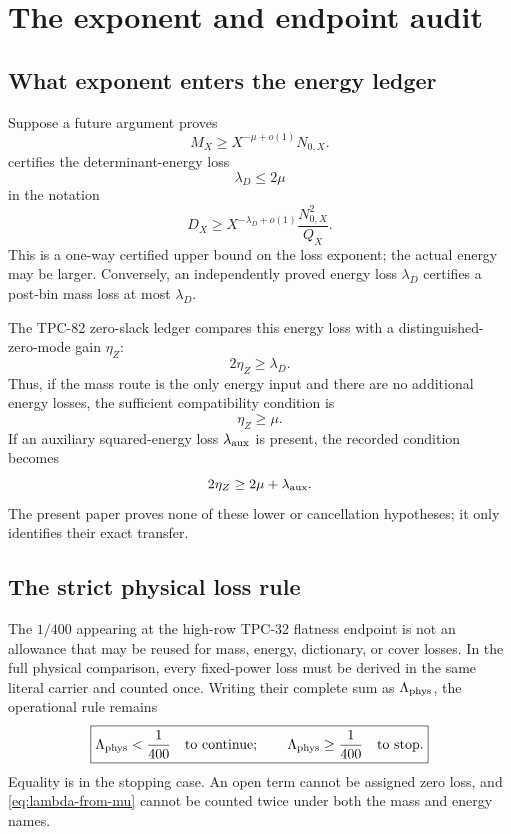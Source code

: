 \section{The exponent and endpoint audit}
\label{sec:endpoint-audit}

\subsection{What exponent enters the energy ledger}

Suppose a future argument proves
\[
 M_X\ge X^{-\mu+o(1)}N_{0,X}.
\]
 certifies the determinant-energy loss
\begin{equation}
 \lambda_D\le2\mu
\label{eq:lambda-from-mu}
\end{equation}
in the notation
\[
 D_X\ge
 X^{-\lambda_D+o(1)}
 \frac{N_{0,X}^2}{Q_X}.
\]
This is a one-way certified upper bound on the loss exponent; the
actual energy may be larger.  Conversely, an independently proved
energy loss \(\lambda_D\) certifies a post-bin mass loss at most
\(\lambda_D\).

The TPC-82 zero-slack ledger compares this energy loss with a
distinguished-zero-mode gain \(\eta_Z\):
\begin{equation}
 2\eta_Z\ge\lambda_D.
\label{eq:zero-slack-import}
\end{equation}
Thus, if the mass route is the only energy input and there are no
additional energy losses, the sufficient compatibility condition is
\[
 \eta_Z\ge\mu.
\]
If an auxiliary squared-energy loss \(\lambda_{\rm aux}\) is present,
the recorded condition becomes
\[
 2\eta_Z\ge2\mu+\lambda_{\rm aux}.
\]
The present paper proves none of these lower or cancellation
hypotheses; it only identifies their exact transfer.

\subsection{The strict physical loss rule}

The \(1/400\) appearing at the high-row TPC-32 flatness endpoint is
not an allowance that may be reused for mass, energy, dictionary, or
cover losses.  In the full physical comparison, every fixed-power
loss must be derived in the same literal carrier and counted once.
Writing their complete sum as \(\Lambda_{\rm phys}\), the operational
rule remains
\begin{equation}
\boxed{
 \Lambda_{\rm phys}<\frac1{400}
 \quad\text{to continue};\qquad
 \Lambda_{\rm phys}\ge\frac1{400}
 \quad\text{to stop}.}
\label{eq:strict-loss-boundary}
\end{equation}
Equality is in the stopping case.  An open term cannot be assigned
zero loss, and \eqref{eq:lambda-from-mu} cannot be counted twice under
both the mass and energy names.

